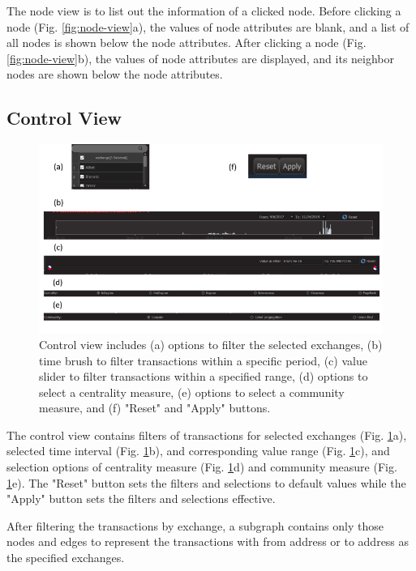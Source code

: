The node view is to list out the information of a clicked node. Before clicking a node (Fig. \ref{fig:node-view}a), the values of node attributes are blank, and a list of all nodes is shown below the node attributes. After clicking a node (Fig. \ref{fig:node-view}b), the values of node attributes are displayed, and its neighbor nodes are shown below the node attributes.

\subsection{Control View}
\label{sec:methodology:view:control}

\begin{figure}[htb]
\includegraphics[width=\textwidth]{gfx/control-view.png}
\caption{Control view includes (a) options to filter the selected exchanges, (b) time brush to filter transactions within a specific period, (c) value slider to filter transactions within a specified range, (d) options to select a centrality measure, (e) options to select a community measure, and (f) "Reset" and "Apply" buttons.}
\label{fig:control-view}
\end{figure}

The control view contains filters of transactions for selected exchanges (Fig. \ref{fig:control-view}a), selected time interval (Fig. \ref{fig:control-view}b), and corresponding value range (Fig. \ref{fig:control-view}c), and selection options of centrality measure (Fig. \ref{fig:control-view}d) and community measure (Fig. \ref{fig:control-view}e). The "Reset" button sets the filters and selections to default values while the "Apply" button sets the filters and selections effective.

After filtering the transactions by exchange, a subgraph contains only those nodes and edges to represent the transactions with from address or to address as the specified exchanges.

